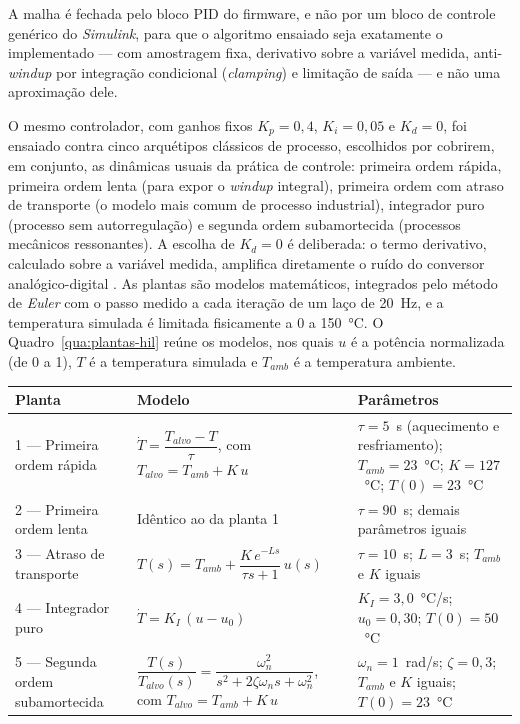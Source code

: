 A malha é fechada pelo bloco PID do firmware, e não por um bloco de controle genérico do \textit{Simulink}, para que o algoritmo ensaiado seja exatamente o implementado --- com amostragem fixa, derivativo sobre a variável medida, anti-\textit{windup} por integração condicional (\textit{clamping}) e limitação de saída --- e não uma aproximação dele.

O mesmo controlador, com ganhos fixos $K_p = 0{,}4$, $K_i = 0{,}05$ e $K_d = 0$, foi ensaiado contra cinco arquétipos clássicos de processo, escolhidos por cobrirem, em conjunto, as dinâmicas usuais da prática de controle: primeira ordem rápida, primeira ordem lenta (para expor o \textit{windup} integral), primeira ordem com atraso de transporte (o modelo mais comum de processo industrial), integrador puro (processo sem autorregulação) e segunda ordem subamortecida (processos mecânicos ressonantes).
A escolha de $K_d = 0$ é deliberada: o termo derivativo, calculado sobre a variável medida, amplifica diretamente o ruído do conversor analógico-digital \cite{astrom:2006}.
As plantas são modelos matemáticos, integrados pelo método de \textit{Euler} com o passo medido a cada iteração de um laço de 20~Hz, e a temperatura simulada é limitada fisicamente a 0 a 150~°C.
O Quadro~\ref{qua:plantas-hil} reúne os modelos, nos quais $u$ é a potência normalizada (de 0 a 1), $T$ é a temperatura simulada e $T_{amb}$ é a temperatura ambiente.

\begin{quadrofixo}
    \centering
    \small
    \begin{tabular}{|p{3.2cm}|p{6.2cm}|p{4.8cm}|}
        \hline
        Planta & Modelo & Parâmetros \\
        \hline
        1 --- Primeira ordem rápida & $\dot{T} = \dfrac{T_{alvo} - T}{\tau}$, com $T_{alvo} = T_{amb} + K\,u$ & $\tau = 5$~s (aquecimento e resfriamento); $T_{amb} = 23$~°C; $K = 127$~°C; $T(0) = 23$~°C \\
        \hline
        2 --- Primeira ordem lenta & Idêntico ao da planta 1 & $\tau = 90$~s; demais parâmetros iguais \\
        \hline
        3 --- Atraso de transporte & $T(s) = T_{amb} + \dfrac{K\,e^{-Ls}}{\tau s + 1}\,u(s)$ & $\tau = 10$~s; $L = 3$~s; $T_{amb}$ e $K$ iguais \\
        \hline
        4 --- Integrador puro & $\dot{T} = K_I\,(u - u_0)$ & $K_I = 3{,}0$~°C/s; $u_0 = 0{,}30$; $T(0) = 50$~°C \\
        \hline
        5 --- Segunda ordem subamortecida & $\dfrac{T(s)}{T_{alvo}(s)} = \dfrac{\omega_n^2}{s^2 + 2\zeta\omega_n s + \omega_n^2}$, com $T_{alvo} = T_{amb} + K\,u$ & $\omega_n = 1$~rad/s; $\zeta = 0{,}3$; $T_{amb}$ e $K$ iguais; $T(0) = 23$~°C \\
        \hline
    \end{tabular}

    \label{qua:plantas-hil}
\end{quadrofixo}

